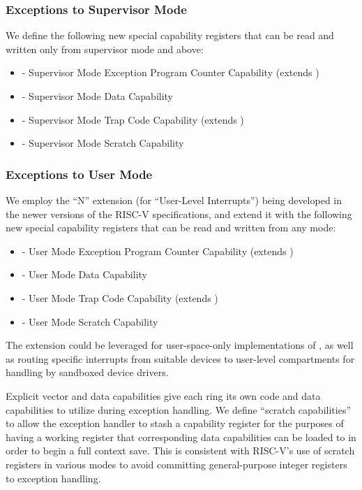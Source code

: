 \subsubsection{Exceptions to Supervisor Mode}

We define the following new special capability registers that can be read and
written only from supervisor mode and above:

\begin{itemize}
\item \SEPCC{} - Supervisor Mode Exception Program Counter Capability (extends
  \sepc{})
\item \STDC{} - Supervisor Mode Data Capability
\item \STCC{} - Supervisor Mode Trap Code Capability (extends
  \stvec{})
\item \SScratchC{} - Supervisor Mode Scratch Capability
\end{itemize}

\subsubsection{Exceptions to User Mode}

We employ the ``N'' extension (for ``User-Level Interrupts'') being developed in
the newer versions of the RISC-V specifications, and extend it with the following
new special capability registers that can be read and written from any mode:

\begin{itemize}
\item \UEPCC{} - User Mode Exception Program Counter Capability (extends
  \uepc{})
\item \UTDC{} - User Mode Data Capability
\item \UTCC{} - User Mode Trap Code Capability (extends \utvec{})
\item \UScratchC{} - User Mode Scratch Capability
\end{itemize}

The extension could be leveraged for user-space-only implementations
of , as well as routing specific interrupts from
suitable devices to user-level compartments for handling by sandboxed
device drivers.

Explicit vector and data capabilities give each ring its
own code and data capabilities to utilize during exception handling.
We define ``scratch capabilities'' to allow the exception handler to stash a
capability register for the purposes of having a working register that
corresponding data capabilities can be loaded to in order to begin a full
context save.
This is consistent with RISC-V's use of scratch registers in various modes to
avoid committing general-purpose integer registers to exception handling.

